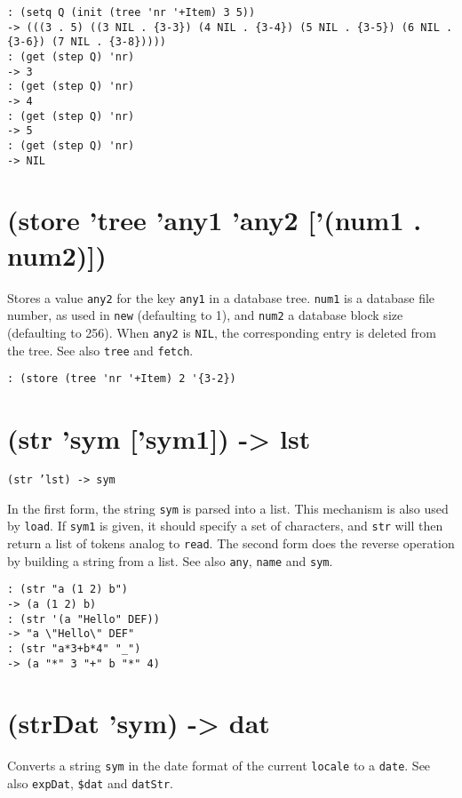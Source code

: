 {{{{{{{{\begin{verbatim}
: (setq Q (init (tree 'nr '+Item) 3 5))
-> (((3 . 5) ((3 NIL . {3-3}) (4 NIL . {3-4}) (5 NIL . {3-5}) (6 NIL . {3-6}) (7 NIL . {3-8}))))
: (get (step Q) 'nr)
-> 3
: (get (step Q) 'nr)
-> 4
: (get (step Q) 'nr)
-> 5
: (get (step Q) 'nr)
-> NIL
\end{verbatim}

 
\section{(store 'tree 'any1 'any2 ['(num1 . num2)])}
\label{sec-8-1-19-37}


Stores a value \texttt{any2} for the key \texttt{any1} in a database tree. \texttt{num1} is a
database file number, as used in \texttt{new} (defaulting to 1), and \texttt{num2} a
database block size (defaulting to 256). When \texttt{any2} is \texttt{NIL}, the
corresponding entry is deleted from the tree. See also \texttt{tree} and
\texttt{fetch}.


\begin{verbatim}
: (store (tree 'nr '+Item) 2 '{3-2})
\end{verbatim}

 
\section{(str 'sym ['sym1]) -> lst}
\label{sec-8-1-19-38}


\texttt{(str 'lst) -> sym}

In the first form, the string \texttt{sym} is parsed into a list. This
mechanism is also used by \texttt{load}. If \texttt{sym1} is given, it should specify
a set of characters, and \texttt{str} will then return a list of tokens analog
to \texttt{read}. The second form does the reverse operation by building a
string from a list. See also \texttt{any}, \texttt{name} and \texttt{sym}.


\begin{verbatim}
: (str "a (1 2) b")
-> (a (1 2) b)
: (str '(a "Hello" DEF))
-> "a \"Hello\" DEF"
: (str "a*3+b*4" "_")
-> (a "*" 3 "+" b "*" 4)
\end{verbatim}

 
\section{(strDat 'sym) -> dat}
\label{sec-8-1-19-39}


Converts a string \texttt{sym} in the date format of the current \texttt{locale} to a
\texttt{date}. See also \texttt{expDat}, \texttt{\$dat} and \texttt{datStr}.


}}}}}}}}
